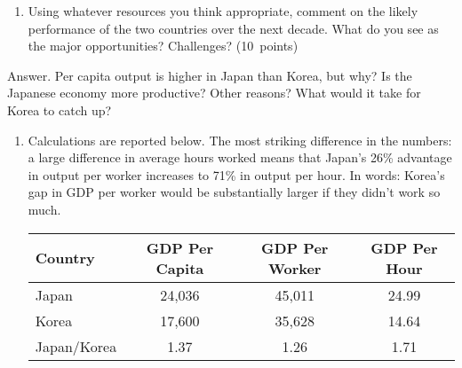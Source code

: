 \documentclass[letterpaper,12pt]{article}
\begin{document}
\begin{enumerate}
\begin{enumerate}
\item Using whatever resources you think appropriate, 
comment on the likely performance of the two countries over the next 
decade.  
What do you see as the major opportunities?  Challenges?  (10~points) 
\end{enumerate}



Answer.
Per capita output is higher in Japan than Korea, but why?
Is the Japanese economy more productive?  Other reasons?  
What would it take for Korea to catch up?  
\begin{enumerate}
\item Calculations are reported below.  
The most striking difference in the numbers:  
a large difference in average hours worked means 
that Japan's 26\% advantage in output per worker 
increases to 71\% in output per hour.  
In words:  Korea's gap in GDP per worker would be substantially 
larger if they didn't work so much.  
%
\begin{center}
\begin{tabular}{lccc}
\hline\hline
Country   &  GDP Per Capita &  GDP Per Worker &  GDP Per Hour \\
\hline\hline
Japan       &  24,036  & 45,011 &  24.99 \\
Korea       &  17,600  & 35,628 &  14.64 \\
Japan/Korea &  1.37 &  1.26 &  1.71 \\
\hline\hline
\end{tabular}
\end{center}


\end{enumerate}
\end{enumerate}
\end{document}
